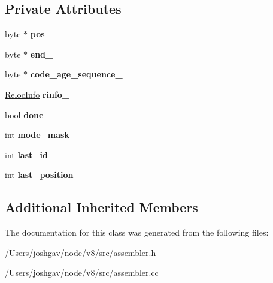 \subsection*{Private Attributes}
\begin{DoxyCompactItemize}
\item 
byte $\ast$ {\bfseries pos\+\_\+}\hypertarget{classv8_1_1internal_1_1_reloc_iterator_a59fbaffc4cfc52ef94cfc4c0000fb08e}{}\label{classv8_1_1internal_1_1_reloc_iterator_a59fbaffc4cfc52ef94cfc4c0000fb08e}

\item 
byte $\ast$ {\bfseries end\+\_\+}\hypertarget{classv8_1_1internal_1_1_reloc_iterator_a5459858858d89656a098f19da1c50296}{}\label{classv8_1_1internal_1_1_reloc_iterator_a5459858858d89656a098f19da1c50296}

\item 
byte $\ast$ {\bfseries code\+\_\+age\+\_\+sequence\+\_\+}\hypertarget{classv8_1_1internal_1_1_reloc_iterator_a168d9d09bd7358cc8db38fb86bec0e46}{}\label{classv8_1_1internal_1_1_reloc_iterator_a168d9d09bd7358cc8db38fb86bec0e46}

\item 
\hyperlink{classv8_1_1internal_1_1_reloc_info}{Reloc\+Info} {\bfseries rinfo\+\_\+}\hypertarget{classv8_1_1internal_1_1_reloc_iterator_a8d1a51744e89b33efacb12d58ef5a87a}{}\label{classv8_1_1internal_1_1_reloc_iterator_a8d1a51744e89b33efacb12d58ef5a87a}

\item 
bool {\bfseries done\+\_\+}\hypertarget{classv8_1_1internal_1_1_reloc_iterator_aff760abfbf49d5da63056fa132ba4bb1}{}\label{classv8_1_1internal_1_1_reloc_iterator_aff760abfbf49d5da63056fa132ba4bb1}

\item 
int {\bfseries mode\+\_\+mask\+\_\+}\hypertarget{classv8_1_1internal_1_1_reloc_iterator_a9f766b5f64182fe25b5aea43cc1afd36}{}\label{classv8_1_1internal_1_1_reloc_iterator_a9f766b5f64182fe25b5aea43cc1afd36}

\item 
int {\bfseries last\+\_\+id\+\_\+}\hypertarget{classv8_1_1internal_1_1_reloc_iterator_a2b5955db2433b834ccc6ba3e8692b182}{}\label{classv8_1_1internal_1_1_reloc_iterator_a2b5955db2433b834ccc6ba3e8692b182}

\item 
int {\bfseries last\+\_\+position\+\_\+}\hypertarget{classv8_1_1internal_1_1_reloc_iterator_a924c8b93cbe1bf06fb9b40b2928ad92d}{}\label{classv8_1_1internal_1_1_reloc_iterator_a924c8b93cbe1bf06fb9b40b2928ad92d}

\end{DoxyCompactItemize}
\subsection*{Additional Inherited Members}


The documentation for this class was generated from the following files\+:\begin{DoxyCompactItemize}
\item 
/\+Users/joshgav/node/v8/src/assembler.\+h\item 
/\+Users/joshgav/node/v8/src/assembler.\+cc\end{DoxyCompactItemize}
